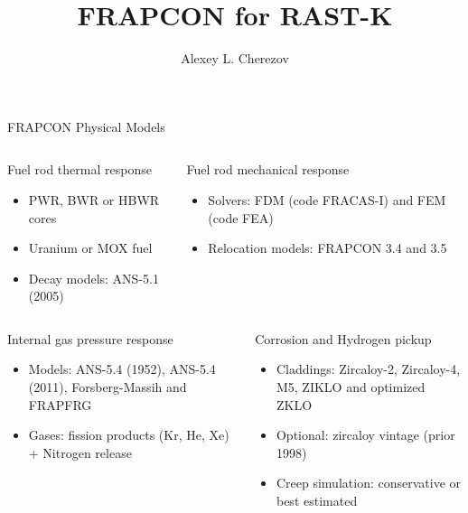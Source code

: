\documentclass[11pt]{beamer}
\author{Alexey L. Cherezov}
\title{FRAPCON for RAST-K}
\institute{UNIST Core}
\begin{document}
\titlepage


\begin{frame}{FRAPCON Physical Models}
  \footnotesize
  
  \begin{columns}
  \begin{block}{Fuel rod thermal response}
     \begin{itemize}
     \item PWR, BWR or HBWR cores
     \item Uranium or MOX fuel
     \item Decay models: ANS-5.1 (2005)
     \end{itemize}
  \end{block}
  \begin{block}{Fuel rod mechanical response}
     \begin{itemize}
     \item Solvers: FDM (code FRACAS-I) and FEM (code FEA)
     \item Relocation models: FRAPCON 3.4 and 3.5
     \end{itemize}  
  \end{block}
  \end{columns}

  \begin{columns}
  \begin{block}{Internal gas pressure response}
     \begin{itemize}
     \item Models: ANS-5.4 (1952), ANS-5.4 (2011), Forsberg-Massih and FRAPFRG
     \item Gases: fission products (Kr, He, Xe) + Nitrogen release
     \end{itemize}
  \end{block}
  \begin{block}{Corrosion and Hydrogen pickup}
     \begin{itemize}
     \item Claddings: Zircaloy-2, Zircaloy-4, M5, ZIKLO and optimized ZKLO
     \item Optional: zircaloy vintage (prior 1998)
     \item Creep simulation: conservative or best estimated
     \end{itemize}
  \end{block}
  \end{columns}

\end{frame}
\end{document}
